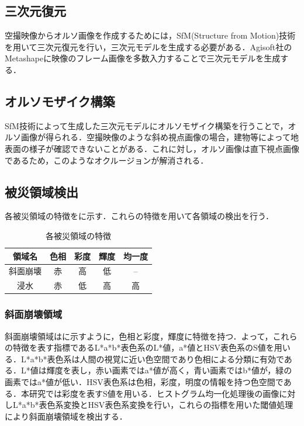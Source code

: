 \documentclass[a4paper, twocolumn, xelatex, 10pt, ja=standard, Ligatures=TeX]{bxjsarticle}
\begin{document}
\subsection{三次元復元}
	空撮映像からオルソ画像を作成するためには，SfM(Structure from Motion)技術を用いて三次元復元を行い，三次元モデルを生成する必要がある．Agisoft社のMetashapeに映像のフレーム画像を多数入力することで三次元モデルを生成する．

\subsection{オルソモザイク構築}
	SfM技術によって生成した三次元モデルにオルソモザイク構築を行うことで，オルソ画像が得られる．空撮映像のような斜め視点画像の場合，建物等によって地表面の様子が確認できないことがある．これに対し，オルソ画像は直下視点画像であるため，このようなオクルージョンが解消される．
	
\subsection{被災領域検出}
	各被災領域の特徴をに示す．これらの特徴を用いて各領域の検出を行う．

	\begin{table}[b]
		\centering
		\caption{各被災領域の特徴}
		\label{tab01}
		\begin{tabular}{c c c c c}
			\hline
			領域名 & 色相 & 彩度 & 輝度 & 均一度 \\
			\hline
			\hline
			斜面崩壊 & 赤 & 高 & 低 & -- \\
			浸水 & 赤 & 低 & 高 & 高 \\ \hline
		\end{tabular}
	\end{table}

	\subsubsection{斜面崩壊領域}
		斜面崩壊領域はに示すように，色相と彩度，輝度に特徴を持つ．よって，これらの特徴を表す指標であるL*a*b*表色系のL*値，a*値とHSV表色系のS値を用いる．L*a*b*表色系は人間の視覚に近い色空間であり色相による分類に有効である．L*値は輝度を表し，赤い画素ではa*値が高く，青い画素ではb*値が，緑の画素ではa*値が低い．HSV表色系は色相，彩度，明度の情報を持つ色空間である．本研究では彩度を表すS値を用いる．ヒストグラム均一化処理後の画像に対しL*a*b*表色系変換とHSV表色系変換を行い，これらの指標を用いた閾値処理により斜面崩壊領域を検出する．
	
\end{document}
